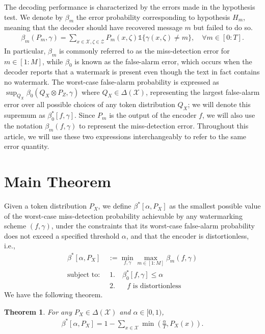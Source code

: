 \documentclass[11pt,letterpaper]{article}
\newtheorem{theorem}{\textbf{Theorem}}
\newcommand{\cX}{\mathcal{X}}
\newcommand{\cZ}{\mathcal{Z}}
\begin{document}
The decoding performance is characterized by the errors made in the hypothesis test. We denote by $\beta_m$ the error probability corresponding to hypothesis $H_m$, meaning that the decoder should have recovered message $m$ but failed to do so. 
\begin{align}
    \beta_m(P_m, \gamma) = \sum_{x\in \cX, \zeta \in \cZ} P_m(x,\zeta)\mathds{1}\{\gamma(x,\zeta) \neq m \}, \quad \forall m \in [0:T].
\end{align}
In particular, $\beta_m$ is commonly referred to as the miss-detection error for $m \in [1:M]$, while $\beta_0$ is known as the false-alarm error, which occurs when the decoder reports that a watermark is present even though the text in fact contains no watermark. The worst-case false-alarm probability is expressed as $\sup_{Q_X} \beta_0(Q_X \otimes P_Z, \gamma)$ where $Q_X\in\Delta(\cX)$, representing the largest false-alarm error over all possible choices of any token distribution $Q_X$; we will denote this supremum as $\beta_0^*[f,\gamma]$. 
Since $P_m$ is the output of the encoder $f$, we will also use the notation $\beta_m(f,\gamma)$ to represent the miss-detection error. Throughout this article, we will use these two expressions interchangeably to refer to the same error quantity.


\section{Main Theorem} \label{sec:main-thm}


Given a token distribution $P_X$, we define $\beta^*[\alpha, P_X]$ as the smallest possible value of the worst-case miss-detection probability achievable by any watermarking scheme $(f,\gamma)$, under the constraints that its worst-case false-alarm probability does not exceed a specified threshold $\alpha$, and that the encoder is distortionless, i.e., 
\begin{align*}
    \beta^*[\alpha, P_X] & := \min_{f,\gamma} \max_{m \in [1:M]} \beta_m(f, \gamma) \\
    \text{subject to: } & ~ 1.  \quad \beta_0^*[f,\gamma] \leq \alpha \\
    & ~ 2.  \quad \text{ $f$ is distortionless}
\end{align*}
We have the following theorem. 


\begin{theorem}\label{thm:main_thm}
    For any $P_X \in \Delta(\cX)$ and $\alpha \in [0,1)$, 
    \begin{align}
        \beta^*[\alpha, P_X] = 1 - \sum_{x\in \cX} \min\left(\tfrac{\alpha}{T}, P_X(x)\right). \label{eq:min_error}
    \end{align}
\end{theorem}
\end{document}
